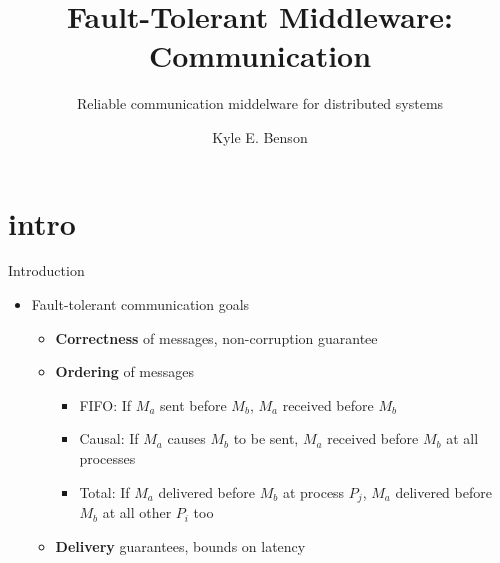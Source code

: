 \documentclass[pdftex]{beamer}
\begin{document}

\title[FT Comm. MW]{Fault-Tolerant Middleware: Communication}
\subtitle{Reliable communication middelware for distributed systems}
\author[K. Benson]{Kyle E. Benson}


\begin{frame}[plain]
	\titlepage
\end{frame}

\part{intro}

\begin{frame}{Introduction}

\begin{itemize}
	\item Fault-tolerant communication goals
	\begin{itemize}
		\item \textbf{Correctness} of messages, non-corruption guarantee
		\item \textbf{Ordering} of messages
		\begin{itemize}
			\item FIFO: If $M_a$ sent before $M_b$, $M_a$ received before $M_b$
			\item Causal: If $M_a$ causes $M_b$ to be sent, $M_a$ received before $M_b$ at all processes
			\item Total: If $M_a$ delivered before $M_b$ at process $P_j$, $M_a$ delivered before $M_b$ at all other $P_i$ too
		\end{itemize}
		\item \textbf{Delivery} guarantees, bounds on latency
	\end{itemize}
\end{itemize}
\end{frame}

\end{document}
